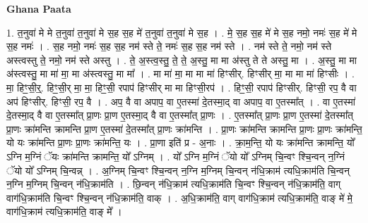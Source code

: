 \documentclass[17pt]{extarticle}
\begin{document}
\textbf{Ghana Paata } \newline

1. त॒नुवा॑ मे मे त॒नुवा॑ त॒नुवा॑ मे स॒ह स॒ह मे॑ त॒नुवा॑ त॒नुवा॑ मे स॒ह । . मे॒ स॒ह स॒ह मे॑ मे स॒ह नमो॒ नमः॑ स॒ह मे॑ मे स॒ह नमः॑ । . स॒ह नमो॒ नमः॑ स॒ह स॒ह नम॑ स्ते ते॒ नमः॑ स॒ह स॒ह नम॑ स्ते । . नम॑ स्ते ते॒ नमो॒ नम॑ स्ते अस्त्वस्तु ते॒ नमो॒ नम॑ स्ते अस्तु । . ते॒ अ॒स्त्व॒स्तु॒ ते॒ ते॒ अ॒स्तु॒ मा मा अ॑स्तु ते ते अस्तु॒ मा । . अ॒स्तु॒ मा मा अ॑स्त्वस्तु॒ मा मा॑ मा॒ मा अ॑स्त्वस्तु॒ मा मा᳚ । . मा मा॑ मा॒ मा मा मा॑ हिꣳसीर्. हिꣳसीर् मा॒ मा मा मा॑ हिꣳसीः । . मा॒ हिꣳ॒॒सी॒र्॒. हिꣳ॒॒सी॒र् मा॒ मा॒ हिꣳ॒॒सी॒ रपाप॑ हिꣳसीर् मा मा हिꣳसी॒रप॑ । . हिꣳ॒॒सी॒ रपाप॑ हिꣳसीर्. हिꣳसी॒ रप॒ वै वा अप॑ हिꣳसीर्. हिꣳसी॒ रप॒ वै । . अप॒ वै वा अपाप॒ वा ए॒तस्मा॑ दे॒तस्मा॒द् वा अपाप॒ वा ए॒तस्मा᳚त् । . वा ए॒तस्मा॑ दे॒तस्मा॒द् वै वा ए॒तस्मा᳚त् प्रा॒णः प्रा॒ण ए॒तस्मा॒द् वै वा ए॒तस्मा᳚त् प्रा॒णः । . ए॒तस्मा᳚त् प्रा॒णः प्रा॒ण ए॒तस्मा॑ दे॒तस्मा᳚त् प्रा॒णः क्रा॑मन्ति क्रामन्ति प्रा॒ण ए॒तस्मा॑ दे॒तस्मा᳚त् प्रा॒णः क्रा॑मन्ति । . प्रा॒णः क्रा॑मन्ति क्रामन्ति प्रा॒णः प्रा॒णः क्रा॑मन्ति॒ यो यः क्रा॑मन्ति प्रा॒णः प्रा॒णः क्रा॑मन्ति॒ यः । . प्रा॒णा इति॑ प्र - अ॒नाः । . क्रा॒म॒न्ति॒ यो यः क्रा॑मन्ति क्रामन्ति॒ यो᳚ ऽग्नि म॒ग्निं ॅयः क्रा॑मन्ति क्रामन्ति॒ यो᳚ ऽग्निम् । . यो᳚ ऽग्नि म॒ग्निं ॅयो यो᳚ ऽग्निम् चि॒न्वꣳ श्चि॒न्वन् न॒ग्निं ॅयो यो᳚ ऽग्निम् चि॒न्वन्न् । . अ॒ग्निम् चि॒न्वꣳ श्चि॒न्वन् न॒ग्नि म॒ग्निम् चि॒न्वन् न॑धि॒क्राम॑ त्यधि॒क्राम॑ति चि॒न्वन् न॒ग्नि म॒ग्निम् चि॒न्वन् न॑धि॒क्राम॑ति । . छि॒न्वन् न॑धि॒क्राम॑ त्यधि॒क्राम॑ति चि॒न्वꣳ श्चि॒न्वन् न॑धि॒क्राम॑ति॒ वाग् वाग॑धि॒क्राम॑ति चि॒न्वꣳ श्चि॒न्वन् न॑धि॒क्राम॑ति॒ वाक् । . अ॒धि॒क्राम॑ति॒ वाग् वाग॑धि॒क्राम॑ त्यधि॒क्राम॑ति॒ वाङ् मे॑ मे॒ वाग॑धि॒क्राम॑ त्यधि॒क्राम॑ति॒ वाङ् मे᳚ । \newline
\end{document}
